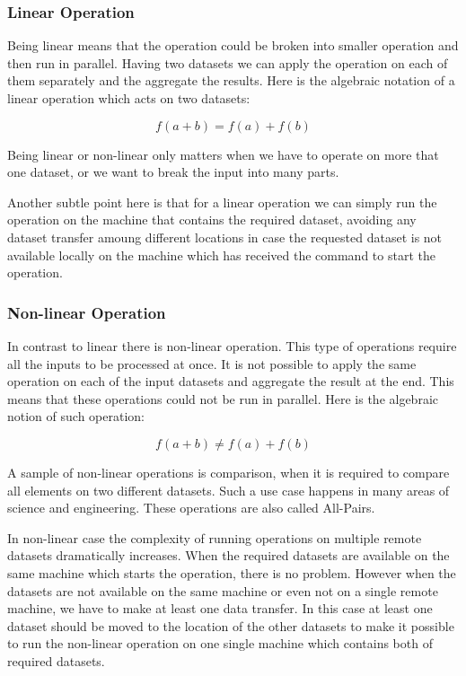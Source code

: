 \subsubsection{Linear Operation}
Being linear means that the operation
could be broken into smaller operation and then run in parallel. Having two datasets we can apply the
operation on each of them separately and the aggregate the results. Here is the algebraic notation
of a linear operation which acts on two datasets:

\[ f(a + b) = f(a) + f(b) \]

Being linear or non-linear only matters when we have to operate on more that one dataset, or we want to
break the input into many parts.

Another subtle point here is that for a linear operation we can simply run the operation on the machine that
contains the required dataset, avoiding any dataset transfer amoung different locations in case the requested
dataset is not available locally on the machine which has received the command to start the operation.

\subsubsection{Non-linear Operation}
In contrast to linear there is non-linear operation. This type of operations require all the inputs to be processed
at once. It is not possible to apply the same operation on each of the input datasets and aggregate the result at the
end. This means that these operations could not be run in parallel.
Here is the algebraic notion of such operation:

\[ f(a + b) \neq f(a) + f(b) \]

A sample of non-linear operations is comparison, when it is required to compare all elements on two different datasets. 
Such a use case happens in many areas of science and engineering. These operations are also called All-Pairs. \cite{moretti08}

In non-linear case the complexity of running operations on multiple remote datasets dramatically increases. When the required
datasets are available on the same machine which starts the operation, there is no problem. However when the datasets are not
available on the same machine or even not on a single remote machine, we have to make at least one data transfer. In this 
case at least one dataset should be moved to the location of the other datasets to make it possible to run the non-linear
operation on one single machine which contains both of required datasets.

